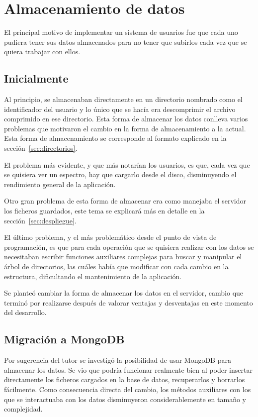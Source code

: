 
\section{Almacenamiento de datos}

El principal motivo de implementar un sistema de usuarios fue que cada uno
pudiera tener sus datos almacenados para no tener que subirlos cada vez que se
quiera trabajar con ellos.

\subsection{Inicialmente}

Al principio, se almacenaban directamente en un directorio nombrado como el
identificador del usuario y lo único que se hacía era descomprimir el archivo
comprimido en ese directorio. Esta forma de almacenar los datos conlleva varios
problemas que motivaron el cambio en la forma de almacenamiento a la actual.
Esta forma de almacenamiento se corresponde al formato explicado en la
sección~\ref{sec:directorios}.

El problema más evidente, y que más notarían los usuarios, es que, cada vez que
se quisiera ver un espectro, hay que cargarlo desde el disco, disminuyendo el
rendimiento general de la aplicación.

Otro gran problema de esta forma de almacenar era como manejaba el servidor los
ficheros guardados, este tema se explicará más en detalle en la
sección~\ref{sec:despliegue}.

El último problema, y el más problemático desde el punto de vista de programación,
es que para cada operación que se quisiera realizar con los datos se necesitaban
escribir funciones auxiliares complejas para buscar y manipular el árbol de
directorios, las cuáles había que modificar con cada cambio en la estructura,
dificultando el mantenimiento de la aplicación.

Se planteó cambiar la forma de almacenar los datos en el servidor, cambio que
terminó por realizarse después de valorar ventajas y desventajas en este momento
del desarrollo.

\subsection{Migración a MongoDB}\label{sec:migrate-mongo}

Por sugerencia del tutor se investigó la posibilidad de usar MongoDB para
almacenar los datos. Se vio que podría funcionar realmente bien al poder
insertar directamente los ficheros cargados en la base de datos, recuperarlos y
borrarlos fácilmente. Como consecuencia directa del cambio, los métodos
auxiliares con los que se interactuaba con los datos disminuyeron
considerablemente en tamaño y complejidad.

